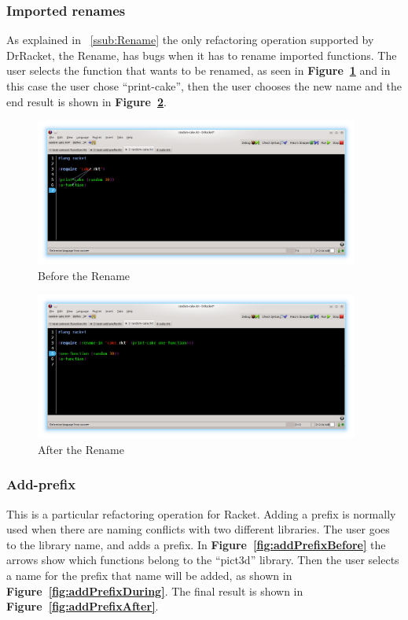 \subsubsection{Imported renames}
As explained in ~\ref{ssub:Rename} the only refactoring operation supported by DrRacket, the Rename, has bugs when it has to rename imported functions.
The user selects the function that wants to be renamed, as seen in {\bf Figure~\ref{fig:renameBefore}} and in this case the user chose ``print-cake'', then the user chooses the new name and the end result is shown in {\bf Figure~\ref{fig:renameAfter}}.
\begin{figure}[htbp]
	\centering
	\includegraphics[width=0.95\textwidth]{img/rename1.png}
	\caption{Before the Rename}
	\label{fig:renameBefore}
\end{figure}

\begin{figure}[htbp]
	\centering
	\includegraphics[width=0.95\textwidth]{img/rename2.png}
	\caption{After the Rename}
	\label{fig:renameAfter}
\end{figure}

\subsubsection{Add-prefix}

This is a particular refactoring operation for Racket. Adding a prefix is normally used when there are naming conflicts with two different libraries. The user goes to the library name, and adds a prefix.
In {\bf Figure~\ref{fig:addPrefixBefore}} the arrows show which functions belong to the ``pict3d'' library.
Then the user selects a name for the prefix that name will be added, as shown in {\bf Figure~\ref{fig:addPrefixDuring}}. The final result is shown in {\bf Figure~\ref{fig:addPrefixAfter}}.

